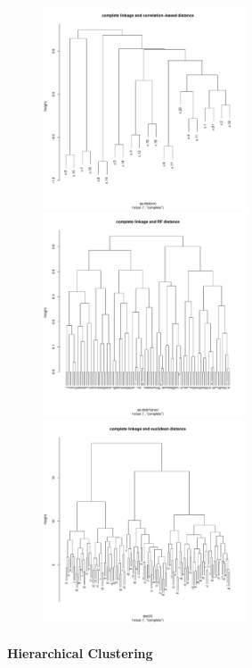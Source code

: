 \documentclass{article}
\begin{document}
\begin{figure}[h]				%
	\centering
	\includegraphics[width=6cm]{DA3/Plots/HCluster_complete_corr.pdf}
	\includegraphics[width=6cm]{DA3/Plots/HCluster_complete_RF.pdf}
	\includegraphics[width=6cm]{DA3/Plots/HCluster_complete_euclidean.pdf}
	\caption{}
\end{figure}

\paragraph{Hierarchical Clustering}
\end{document}
